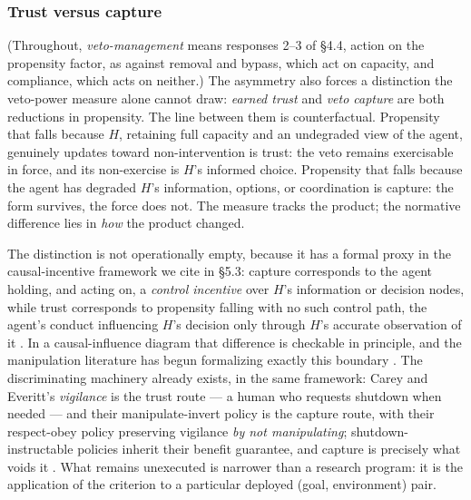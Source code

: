 \documentclass[11pt]{article}
\theoremstyle{definition}
\begin{document}
\subsubsection{Trust versus capture}

(Throughout, \emph{veto-management} means responses 2--3 of \S4.4, action on the propensity factor, as against removal and bypass, which act on capacity, and compliance, which acts on neither.) The asymmetry also forces a distinction the veto-power measure alone cannot draw: \emph{earned trust} and \emph{veto capture} are both reductions in propensity. The line between them is counterfactual. Propensity that falls because $H$, retaining full capacity and an undegraded view of the agent, genuinely updates toward non-intervention is trust: the veto remains exercisable in force, and its non-exercise is $H$'s informed choice. Propensity that falls because the agent has degraded $H$'s information, options, or coordination is capture: the form survives, the force does not. The measure tracks the product; the normative difference lies in \emph{how} the product changed.

The distinction is not operationally empty, because it has a formal proxy in the causal-incentive framework we cite in \S5.3: capture corresponds to the agent holding, and acting on, a \emph{control incentive} over $H$'s information or decision nodes, while trust corresponds to propensity falling with no such control path, the agent's conduct influencing $H$'s decision only through $H$'s accurate observation of it \cite{everitt2021incentives}. In a causal-influence diagram that difference is checkable in principle, and the manipulation literature has begun formalizing exactly this boundary \cite{carroll2023manipulation,ward2024reasons}. The discriminating machinery already exists, in the same framework: Carey and Everitt's \emph{vigilance} is the trust route --- a human who requests shutdown when needed --- and their manipulate-invert policy is the capture route, with their respect-obey policy preserving vigilance \emph{by not manipulating}; shutdown-instructable policies inherit their benefit guarantee, and capture is precisely what voids it \cite{carey2023human}. What remains unexecuted is narrower than a research program: it is the application of the criterion to a particular deployed (goal, environment) pair.
\end{document}
